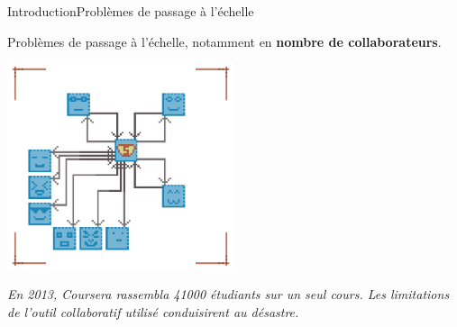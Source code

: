 \begin{frame}{Introduction}{Problèmes de passage à l'échelle}
  
  Problèmes de passage à l'échelle, notamment en \textbf{nombre de
    collaborateurs}.
  
  \vspace{0.5cm}
  
  \begin{center}
    \includegraphics[width=0.5\textwidth]{img/centralizedcpuproblems.png}
  \end{center}
  
  \vspace{0.25cm}

  \textit{En 2013, Coursera rassembla 41000 étudiants sur un seul cours.  Les
    limitations de l'outil collaboratif utilisé conduisirent au \og
    désastre\fg{}.}

  \vspace{0.25cm}

\end{frame}


